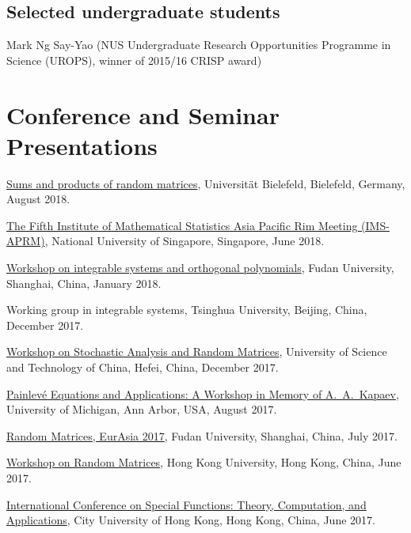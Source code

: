 \documentclass[12pt,a4paper]{article}
\newenvironment{item_list}{
 \begin{list}{}{
   \setlength{\leftmargin}{1.5em}
   \setlength{\itemsep}{0.25em}
   \setlength{\parskip}{0pt}
   \setlength{\parsep}{0.25em}
 }
}{
 \end{list}
}
\begin{document}
\subsection*{Selected undergraduate students}

Mark Ng Say-Yao (NUS Undergraduate Research Opportunities Programme in Science (UROPS), winner of 2015/16 CRISP award)

\section*{Conference and Seminar Presentations}

\begin{item_list}
\item
  \href{https://www.uni-bielefeld.de/(en)/ZiF/AG/2018/08-27-Akemann.html}{Sums and products of random matrices}, Universit\"{a}t Bielefeld, Bielefeld, Germany, August 2018.
\item
  \href{https://ims-aprm2018.stat.nus.edu.sg/}{The Fifth Institute of Mathematical Statistics Asia Pacific Rim Meeting (IMS-APRM)}, National University of Singapore, Singapore, June 2018.
\item
  \href{http://math.fudan.edu.cn/en/Data/View/-99994362}{Workshop on integrable systems and orthogonal polynomials}, Fudan University, Shanghai, China, January 2018.
\item
  Working group in integrable systems, Tsinghua University, Beijing, China, December 2017.
\item
  \href{http://wulab.ustc.edu.cn/bencandy.php?fid=61&id=1688}{Workshop on Stochastic Analysis and Random Matrices}, University of Science and Technology of China, Hefei, China, December 2017.
\item
  \href{https://lsa.umich.edu/math/centers-outreach/mcaim/painleve-equations-workshop--august-25-29--2017.html}{Painlev\'{e} Equations and Applications: A Workshop in Memory of A.~A.~Kapaev}, University of Michigan, Ann Arbor, USA, August 2017.
\item
  \href{http://www.fst.umac.mo/en/staff/documents/yayangchen/Workshop%20on%20RMT17.pdf}{Random Matrices, EurAsia 2017}, Fudan University, Shanghai, China, July 2017.
\item
  \href{http://hkumath.hku.hk/~imr/records1617/Workshop%20on%20Random%20Matrices_2017Jun16.pdf}{Workshop on Random Matrices}, Hong Kong University, Hong Kong, China, June 2017.
\item 
  \href{http://www6.cityu.edu.hk/rcms/icsf2017/index.htm}{International Conference on Special Functions: Theory, Computation, and Applications}, City University of Hong Kong, Hong Kong, China, June 2017.

\end{item_list}
\end{document}

